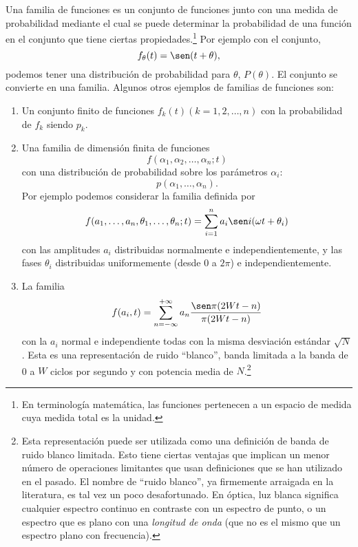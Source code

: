 Una familia de funciones es un conjunto de funciones junto con una
medida de probabilidad mediante el cual se puede determinar la
probabilidad de una funci\'on en el conjunto que tiene ciertas
propiedades.\footnote[1]{En terminolog\'ia matem\'atica, las funciones
pertenecen a un espacio de medida cuya medida total es la unidad.} Por
ejemplo con el conjunto,
\begin{equation}
  f_{\theta}(t) = \sen(t+\theta),
\end{equation}
podemos tener una distribuci\'on de probabilidad para $\theta$, $P(\theta)$.
El conjunto se convierte en una familia. Algunos otros ejemplos de familias de
funciones son:
\begin{enumerate}
  \item Un conjunto finito de funciones $f_k(t)(k=1, 2, \ldots, n)$
  con la probabilidad de $f_k$ siendo $p_k$.

  \item Una familia de dimensi\'on finita de funciones
  \begin{equation}
    f(\alpha_1, \alpha_2, \ldots, \alpha_n; t)
  \end{equation}
  con una distribuci\'on de probabilidad sobre los par\'ametros $\alpha_i$:
  \begin{equation}
    p(\alpha_1, \ldots, \alpha_n).
  \end{equation}
  Por ejemplo podemos considerar la familia definida por
  \begin{equation}
    f(a_1, \ldots, a_n, \theta_1, \ldots, \theta_n; t) = \sum_{i=1}^{n} a_i
    \sen i(\omega t + \theta_i)
  \end{equation}
  con las amplitudes $a_i$ distribuidas normalmente e independientemente,
  y las fases $\theta_i$ distribuidas uniformemente (desde 0 a $2\pi$) e
  independientemente.

  \item La familia
  \begin{equation}
    f(a_i, t) = \sum_{n=-\infty}^{+\infty} a_n \frac{\sen\pi(2Wt-n)}{\pi(2Wt-n)}
  \end{equation}
  con la $a_i$ normal e independiente todas con la misma desviaci\'on
  est\'andar $\sqrt{N}$. Esta es una representaci\'on de ruido ``blanco'',
  banda limitada a la banda de 0 a $W$ ciclos por segundo y con potencia
  media de $N$.\footnote[2]{Esta representaci\'on puede ser utilizada
  como una definici\'on de banda de ruido blanco limitada. Esto tiene
  ciertas ventajas que implican un menor n\'umero de operaciones
  limitantes que usan definiciones que se han utilizado en el
  pasado. El nombre de ``ruido blanco'', ya firmemente arraigada en la
  literatura, es tal vez un poco desafortunado. En \'optica, luz
  blanca significa cualquier espectro continuo en contraste con un
  espectro de punto, o un espectro que es plano con una {\em longitud
  de onda} (que no es el mismo que un espectro plano con frecuencia).}


\end{enumerate}
